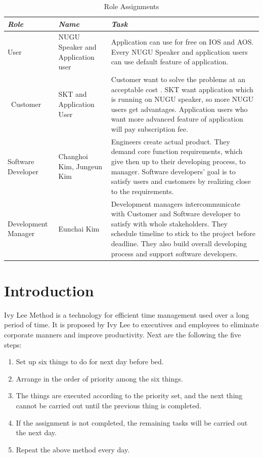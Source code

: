 \documentclass[conference]{IEEEtran}
\begin{document}
\begin{table}
\caption{Role Assignments}
\begin{center}
\begin{tabular}{ | m{4em} | m{2cm}| m{4cm} | }
\hline
\textbf{\textit{Role}}& \textbf{\textit{Name}}& \textbf{\textit{Task}} \\
\hline
User& NUGU Speaker and Application user & Application can use for free on IOS and AOS. Every NUGU Speaker and application users can use default feature of application. \\
\hline\
Customer& SKT and Application User & Customer want to solve the problems at an acceptable cost . SKT want application which is running on NUGU speaker, so more NUGU users get advantages. Application users who want more advanced feature of application will pay subscription fee. \\
\hline
Software Developer & Changhoi Kim, Jungeun Kim & Engineers create actual product. They demand core function requirements, which give then up to their developing process, to manager. Software developers’ goal is to satisfy users and customers by realizing close to the requirements. \\
\hline
Development Manager & Eunchai Kim & Development managers intercommunicate with Customer and Software developer to satisfy with whole stakeholders. They schedule timeline to stick to the project before deadline. They also build overall developing process and support software developers.\\
\hline
\end{tabular}
\label{tab1}
\end{center}
\end{table}

\section{Introduction}
Ivy Lee Method is a technology for efficient time management used over a long period of time. It is proposed by Ivy Lee to executives and employees to eliminate corporate manners and improve productivity. Next are the following the five steps:\\

\begin{enumerate}
\item Set up six things to do for next day before bed. \\
\item Arrange in the order of priority among the six things. \\
\item The things are executed according to the priority set, and the next thing cannot be carried out until the previous thing is completed. \\
\item If the assignment is not completed, the remaining tasks will be carried out the next day. \\
\item Repeat the above method every day. \\
\end{enumerate}
 
\end{document}
